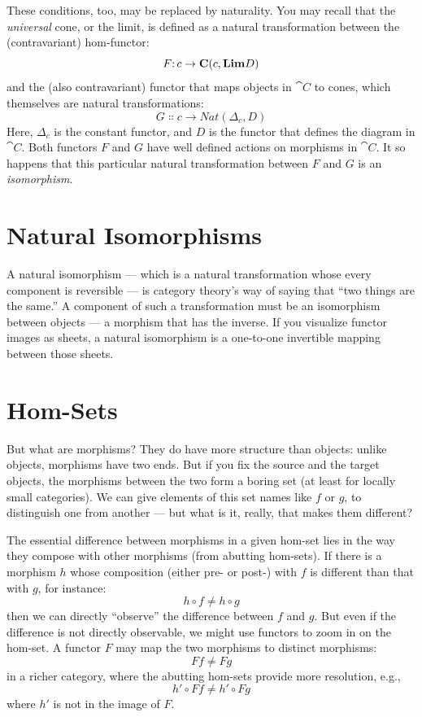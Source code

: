 These conditions, too, may be replaced by naturality. You may recall
that the \emph{universal} cone, or the limit, is defined as a natural
transformation between the (contravariant) hom-functor:
\[F \Colon c \to \cat{C}(c, \Lim[D])\]
and the (also contravariant) functor that maps objects in $\cat{C}$ to
cones, which themselves are natural transformations:
\[G \Colon c \to \mathit{Nat}(\Delta_c, D)\]
Here, $\Delta_c$ is the constant functor, and $D$ is the functor
that defines the diagram in $\cat{C}$. Both functors $F$ and
$G$ have well defined actions on morphisms in $\cat{C}$. It so
happens that this particular natural transformation between $F$
and $G$ is an \emph{isomorphism}.

\section{Natural Isomorphisms}

A natural isomorphism --- which is a natural transformation whose every
component is reversible --- is category theory's way of saying that
``two things are the same.'' A component of such a transformation must
be an isomorphism between objects --- a morphism that has the inverse.
If you visualize functor images as sheets, a natural isomorphism is a
one-to-one invertible mapping between those sheets.

\section{Hom-Sets}

But what are morphisms? They do have more structure than objects: unlike
objects, morphisms have two ends. But if you fix the source and the
target objects, the morphisms between the two form a boring set (at
least for locally small categories). We can give elements of this set
names like $f$ or $g$, to distinguish one from another ---
but what is it, really, that makes them different?

The essential difference between morphisms in a given hom-set lies in
the way they compose with other morphisms (from abutting hom-sets). If
there is a morphism $h$ whose composition (either pre- or post-)
with $f$ is different than that with $g$, for instance:
\[h \circ f \neq h \circ g\]
then we can directly ``observe'' the difference between $f$ and
$g$. But even if the difference is not directly observable, we
might use functors to zoom in on the hom-set. A functor $F$ may
map the two morphisms to distinct morphisms:
\[F f \neq F g\]
in a richer category, where the abutting hom-sets provide more
resolution, e.g.,
\[h' \circ F f \neq h' \circ F g\]
where $h'$ is not in the image of $F$.

